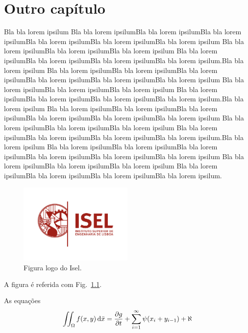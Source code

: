 \chapter{Outro capítulo}

Bla bla lorem ipsilum Bla bla lorem ipsilumBla bla lorem ipsilumBla bla
lorem ipsilumBla bla lorem ipsilumBla bla lorem ipsilumBla bla lorem
ipsilum Bla bla lorem ipsilumBla bla lorem ipsilumBla bla lorem ipsilum
Bla bla lorem ipsilumBla bla lorem ipsilumBla bla lorem ipsilumBla bla
lorem ipsilum.Bla bla lorem ipsilum Bla bla lorem ipsilumBla bla lorem ipsilumBla bla
lorem ipsilumBla bla lorem ipsilumBla bla lorem ipsilumBla bla lorem
ipsilum Bla bla lorem ipsilumBla bla lorem ipsilumBla bla lorem ipsilum
Bla bla lorem ipsilumBla bla lorem ipsilumBla bla lorem ipsilumBla bla
lorem ipsilum.Bla bla lorem ipsilum Bla bla lorem ipsilumBla bla lorem ipsilumBla bla
lorem ipsilumBla bla lorem ipsilumBla bla lorem ipsilumBla bla lorem
ipsilum Bla bla lorem ipsilumBla bla lorem ipsilumBla bla lorem ipsilum
Bla bla lorem ipsilumBla bla lorem ipsilumBla bla lorem ipsilumBla bla
lorem ipsilum.Bla bla lorem ipsilum Bla bla lorem ipsilumBla bla lorem ipsilumBla bla
lorem ipsilumBla bla lorem ipsilumBla bla lorem ipsilumBla bla lorem
ipsilum Bla bla lorem ipsilumBla bla lorem ipsilumBla bla lorem ipsilum
Bla bla lorem ipsilumBla bla lorem ipsilumBla bla lorem ipsilumBla bla
lorem ipsilum.


\begin{figure}[!h]
  {\centering
    \includegraphics[width=0.5\textwidth]{chapter2/logo-isel}
    \caption{Figura logo do Isel.}\label{fig:figura2}
   \par}
\end{figure}

A figura é referida com Fig.~\ref{fig:figura2}.

As equações
 \begin{equation}\label{eq:eq2}
   \iint_\Omega f(x,y)\, {\rm d} \bar x =\frac{\partial g}{\partial t}
   +\sum_{i=1}^\infty \psi(x_i+y_{i-1})+\aleph
\end{equation}

